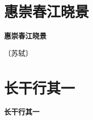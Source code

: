 \documentclass[12pt,UTF-8,openany,fontset=none]{ctexbook}
\begin{document}
\vspace{8pt}
\clearpage


\section{惠崇春江晓景}



\begin{center}
    {\bfseries 惠崇春江晓景}
\end{center}

\begin{center}
    \vspace{10pt}
    
    \begin{large}
        
        〔苏轼〕
        
    \end{large}
    
    \vspace{8pt}
    
    \begin{huge}
        
        \phantom{。}

        \phantom{。}
        
        \phantom{。}

        \phantom{。}
        
    \end{huge}
    
\end{center}

\vspace{8pt}
\clearpage

\section{长干行其一}



\begin{center}
    {\bfseries 长干行其一}
\end{center}
\end{document}

